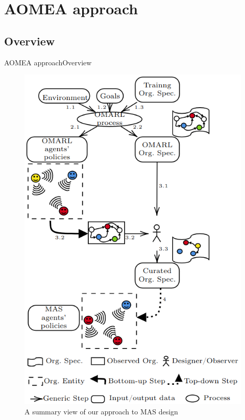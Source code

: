 \AtBeginSection[]{
    \begin{frame}
        \frametitle{}
        \tableofcontents[currentsection]
    \end{frame}
}


\section{AOMEA approach}

\subsection{Overview}

\begin{frame}{AOMEA approach}{Overview}

    \begin{figure}[h!]
        \centering
        \includegraphics[width=0.3\linewidth]{figures/AOMEA_illustrative_view}
        \caption{A summary view of our approach to MAS design}
        \label{fig:design_approach}
    \end{figure}

\end{frame}


